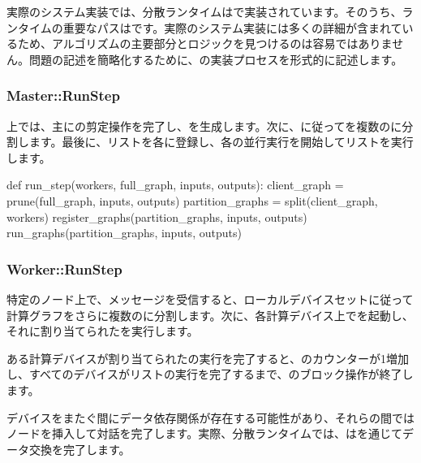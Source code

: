 \begin{content}
実際のシステム実装では、分散ランタイムはで実装されています。そのうち、\tf{}ランタイムの重要なパスはです。実際のシステム実装には多くの詳細が含まれているため、アルゴリズムの主要部分とロジックを見つけるのは容易ではありません。問題の記述を簡略化するために、の実装プロセスを形式的に記述します。

\subsubsection{Master::RunStep}

上では、主にの剪定操作を完了し、を生成します。次に、に従ってを複数のに分割します。最後に、リストを各に登録し、各の並行実行を開始してリストを実行します。

\begin{leftbar}
\begin{python}
def run_step(workers, full_graph, inputs, outputs):
  client_graph = prune(full_graph, inputs, outputs)
  partition_graphs = split(client_graph, workers)
  register_graphs(partition_graphs, inputs, outputs)
  run_graphs(partition_graphs, inputs, outputs)
\end{python}
\end{leftbar}

\subsubsection{Worker::RunStep}

特定のノード上で、メッセージを受信すると、ローカルデバイスセットに従って計算グラフをさらに複数のに分割します。次に、各計算デバイス上でを起動し、それに割り当てられたを実行します。

ある計算デバイスが割り当てられたの実行を完了すると、のカウンターが1増加し、すべてのデバイスがリストの実行を完了するまで、のブロック操作が終了します。

デバイスをまたぐ間にデータ依存関係が存在する可能性があり、それらの間ではノードを挿入して対話を完了します。実際、分散ランタイムでは、はを通じてデータ交換を完了します。


\end{content}
